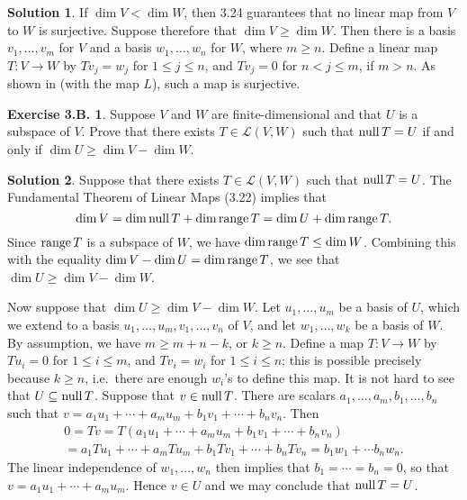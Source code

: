 \documentclass[12pt]{article}
\theoremstyle{definition}
\theoremstyle{exercise}
\newtheorem{exercise}{Exercise 3.B.}
\theoremstyle{solution}
\newtheorem*{solution}{Solution}
\newcommand{\lmap}{\mathcal{L}}
\newcommand{\Null}{\text{null\,}}
\newcommand{\Range}{\text{range\,}}
\begin{document}
\begin{solution}
    If \( \dim V < \dim W \), then 3.24 guarantees that no linear map from \( V \) to \( W \) is surjective. Suppose therefore that \( \dim V \geq \dim W \). Then there is a basis \( v_1, \ldots, v_m \) for \( V \) and a basis \( w_1, \ldots, w_n \) for \( W \), where \( m \geq n \). Define a linear map \( T : V \to W \) by \( Tv_j = w_j \) for \( 1 \leq j \leq n \), and \( Tv_j = 0 \) for \( n < j \leq m \), if \( m > n \). As shown in  (with the map \( L \)), such a map is surjective.
\end{solution}

\begin{exercise}
\label{ex:19}
    Suppose \( V \) and \( W \) are finite-dimensional and that \( U \) is a subspace of \( V \). Prove that there exists \( T \in \lmap(V, W) \) such that \( \Null T = U \) if and only if \( \dim U \geq \dim V - \dim W \).
\end{exercise}

\begin{solution}
    Suppose that there exists \( T \in \lmap(V, W) \) such that \( \Null T = U \). The Fundamental Theorem of Linear Maps (3.22) implies that
    \[
        \dim V = \dim \Null T + \dim \Range T = \dim U + \dim \Range T.
    \]
    Since \( \Range T \) is a subspace of \( W \), we have \( \dim \Range T \leq \dim W \). Combining this with the equality \( \dim V - \dim U = \dim \Range T \), we see that \( \dim U \geq \dim V - \dim W \).

    Now suppose that \( \dim U \geq \dim V - \dim W \). Let \( u_1, \ldots, u_m \) be a basis of \( U \), which we extend to a basis \( u_1, \ldots, u_m, v_1, \ldots, v_n \) of \( V \), and let \( w_1, \ldots, w_k \) be a basis of \( W \). By assumption, we have \( m \geq m + n - k \), or \( k \geq n \). Define a map \( T : V \to W \) by \( Tu_i = 0 \) for \( 1 \leq i \leq m \), and \( Tv_i = w_i \) for \( 1 \leq i \leq n \); this is possible precisely because \( k \geq n \), i.e.\ there are enough \( w_i \)'s to define this map. It is not hard to see that \( U \subseteq \Null T \). Suppose that \( v \in \Null T \). There are scalars \( a_1, \ldots, a_m, b_1, \ldots, b_n \) such that \( v = a_1 u_1 + \cdots + a_m u_m + b_1 v_1 + \cdots + b_n v_n \). Then
    \begin{multline*}
        0 = Tv = T(a_1 u_1 + \cdots + a_m u_m + b_1 v_1 + \cdots + b_n v_n) \\ = a_1 Tu_1 + \cdots + a_m Tu_m + b_1 Tv_1 + \cdots + b_n Tv_n = b_1 w_1 + \cdots b_n w_n.
    \end{multline*}
    The linear independence of \( w_1, \ldots, w_n \) then implies that \( b_1 = \cdots = b_n = 0 \), so that \( v = a_1 u_1 + \cdots + a_m u_m \). Hence \( v \in U \) and we may conclude that \( \Null T = U \).
\end{solution}
\end{document}
